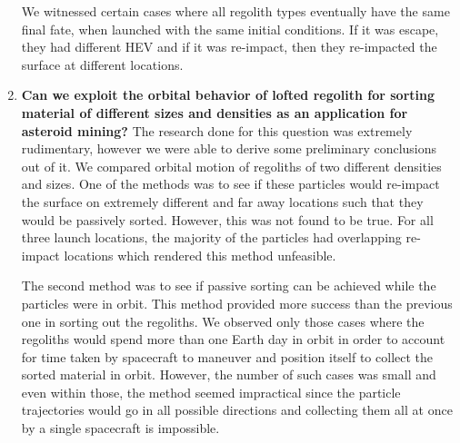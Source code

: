 \begin{enumerate}
We witnessed certain cases where all regolith types eventually have the same final fate, when launched with the same initial conditions. If it was escape, they had different \gls{HEV} and if it was re-impact, then they re-impacted the surface at different locations.

\item \textbf{Can we exploit the orbital behavior of lofted regolith for sorting material of different sizes and densities as an application for asteroid mining?}\newline
The research done for this question was extremely rudimentary, however we were able to derive some preliminary conclusions out of it. We compared orbital motion of regoliths of two different densities and sizes. One of the methods was to see if these particles would re-impact the surface on extremely different and far away locations such that they would be passively sorted. However, this was not found to be true. For all three launch locations, the majority of the particles had overlapping re-impact locations which rendered this method unfeasible.

The second method was to see if passive sorting can be achieved while the particles were in orbit. This method provided more success than the previous one in sorting out the regoliths. We observed only those cases where the regoliths would spend more than one Earth day in orbit in order to account for time taken by spacecraft to maneuver and position itself to collect the sorted material in orbit. However, the number of such cases was small and even within those, the method seemed impractical since the particle trajectories would go in all possible directions and collecting them all at once by a single spacecraft is impossible.

\end{enumerate}
